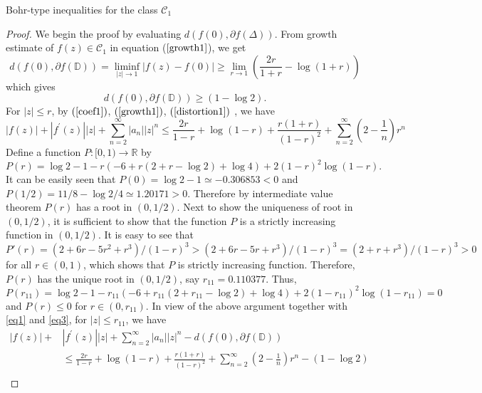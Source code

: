 \documentclass[12pt,a4paper,reqno]{amsart}
\theoremstyle{definition}
\theoremstyle{plain}
\numberwithin{equation}{section}
\begin{document}
\begin{section}{Bohr-type inequalities for the class $\mathcal{C}_1$}
\begin{proof}
We begin the proof by evaluating $d(f(0), \partial{f(\Delta)})$.
From growth estimate of $f(z) \in \mathcal{C}_1$ in equation ($\ref{growth1}$), we get
\begin{equation*}
d(f(0), \partial{f(\mathbb{D})}) = \liminf \limits_{|z| \rightarrow 1} |f(z)-f(0)| \ge \lim \limits_{r \rightarrow 1} \left(\frac{2r}{1+r}- \log(1+r)\right)
\end{equation*}
which gives
\begin{equation}\label{eq1}
d(f(0), \partial{f(\mathbb{D})}) \ge (1-\log{2}).
\end{equation}
For $|z|\leq r$, by $(\ref{coef1})$, $(\ref{growth1})$, $(\ref{distortion1})$ , we have
\begin{equation}\label{eq3}
|f(z)| + |f^{'}(z)||z| + \sum_{n=2}^{\infty} |a_n| |z|^n\leq \frac{2r}{1-r} + \log(1-r) + \frac{r(1+r)}{(1-r)^2} + \sum_{n=2}^{\infty} \left( 2-\frac{1}{n} \right) r^{n}
\end{equation}
Define a function $P:[0, 1)\rightarrow \mathbb{R}$ by
\begin{equation*}
P(r)=  \log2-1-r (-6+r (2+r-\log2)+\log4)+2 (1-r)^2 \log(1-r).
\end{equation*}
It can be easily seen that $P(0)=\log2-1 \simeq-0.306853< 0$ and $P(1/2)={11}/{8}-{\log2}/{4}\simeq1.20171 > 0$. Therefore by intermediate value theorem $P(r)$ has  a  root in $ (0,1/2)$. Next to show  the uniqueness of root in $(0, 1/2)$, it is sufficient to show that the function $P$ is a strictly increasing function in $(0,1/2)$.
 It is easy to see that  $P'(r)=(2+6 r-5 r^2+r^3)/{(1-r)^3}>(2+6 r-5 r+r^3)/{(1-r)^3}=(2+ r+r^3)/{(1-r)^3}>0$ for all $r \in (0,1)$, which shows that $P$ is strictly increasing function.  Therefore, $P(r)$ has the unique root in $(0, 1/2)$, say $r_{11}=0.110377$.
  Thus,
  \begin{equation}\label{eq4}
  P(r_{11})=  \log2-1-r_{11} (-6+r_{11} (2+r_{11}-\log2)+\log4)+2 (1-r_{11})^2 \log(1-r_{11})=0
  \end{equation}
   and $P(r)\leq0$ for $r\in(0, r_{11})$.
\noindent
 In view of the above argument together with   \eqref{eq1}   and \eqref{eq3}, for  $|z| \le r_{11}$, we have
\begin{align*}\label{eq2}
|f(z)| + &|f^{'}(z)||z| + \sum_{n=2}^{\infty} |a_n| |z|^n-d(f(0), \partial{f(\mathbb{D})})\\
& \le \frac{2r}{1-r} + \log(1-r) + \frac{r(1+r)}{(1-r)^2} + \sum_{n=2}^{\infty} \left( 2-\frac{1}{n} \right) r^{n}-(1-\log2)\\

\end{align*}
\end{proof}
\end{section}
\end{document}

